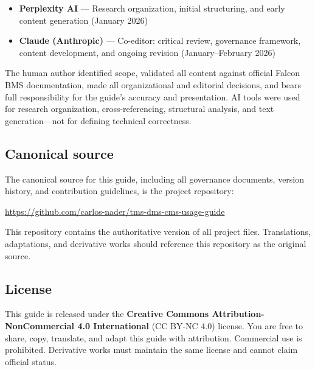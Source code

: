 \documentclass[11pt, a4paper, twoside]{report}
\begin{document}
\begin{itemize}
  \item \textbf{Perplexity AI} --- Research organization, initial structuring, and early content generation (January 2026)
  \item \textbf{Claude (Anthropic)} --- Co-editor: critical review, governance framework, content development, and ongoing revision (January--February 2026)
\end{itemize}

The human author identified scope, validated all content against official Falcon BMS documentation, made all organizational and editorial decisions, and bears full responsibility for the guide's accuracy and presentation. AI tools were used for research organization, cross-referencing, structural analysis, and text generation---not for defining technical correctness.

\subsection{Canonical source}
\label{sec:C1-S4-S3}

The canonical source for this guide, including all governance documents, version history, and contribution guidelines, is the project repository:

\begin{center}
\url{https://github.com/carlos-nader/tms-dms-cms-usage-guide}
\end{center}

This repository contains the authoritative version of all project files. Translations, adaptations, and derivative works should reference this repository as the original source.

\subsection{License}
\label{sec:C1-S4-S4}

This guide is released under the \textbf{Creative Commons Attribution-NonCommercial 4.0 International} (CC BY-NC 4.0) license. You are free to share, copy, translate, and adapt this guide with attribution. Commercial use is prohibited. Derivative works must maintain the same license and cannot claim official status.
\end{document}
